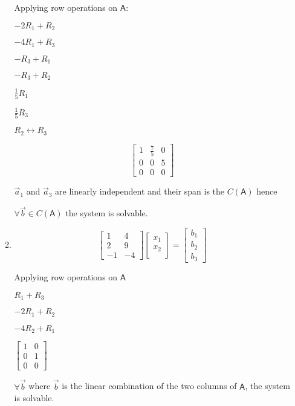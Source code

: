 \documentclass[a4paper, 11pt]{article}
\newcommand{\mat}[1]{\boldsymbol { \mathsf{#1}} }
\begin{document}
\begin{enumerate}
\begin{enumerate}
Applying row operations on $\mat A$: 

\begin{center}
$-2R_1 + R_2$

$-4R_1 + R_3$

$-R_3 + R_1$

$-R_3 + R_2$

$\frac{1}{5} R_1$

$\frac{1}{5} R_3$

$ R_2 \leftrightarrow R_3$
\end{center}


\[ 
\left[ \begin{array}{ccc}
1  & \frac{7}{5} &  0\\
0  &   0 &  5\\
0 & 0 & 0
\end{array} \right]
\]

$\vec a_1$ and $\vec a_3$ are linearly independent and their span is the $C(\mat A)$ hence 

$\forall \vec b \in C(\mat A)$  the system is solvable.


\item
\[ 
\left[ \begin{array}{cc}
1  &   4 \\
2  &  9 \\
-1 & -4 
\end{array} \right]
%
\left[ \begin{array}{c}
 x_1\\
 x_2\\
\end{array} \right]
%
= \left[ \begin{array}{c}
 b_1\\
 b_2\\
 b_3 
\end{array} \right]
\]

Applying row operations on $\mat A$

\begin{center}
	
$R_1 + R_3$

$-2R_1 + R_2$

$-4R_2 + R_1$

$
\begin{bmatrix}
1 & 0 \\ 
0 & 1 \\
0 & 0
\end{bmatrix}
$	
\end{center}

$\forall \vec b$ where $\vec b$ is the linear combination of the two columns of  $\mat A$, the system is solvable.


\end{enumerate}
\end{enumerate}
\end{document}
